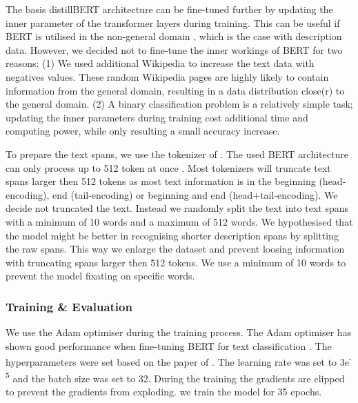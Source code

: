 \documentclass[a4paper, 12pt, oneside]{book} %
\begin{document}
The basis distillBERT architecture can be fine-tuned further by updating the inner parameter of the transformer layers during training. 
This can be useful if BERT is utilised in the non-general domain \autocite{devlin_bert_2019, sun_how_2020, sanh_distilbert_2020}, which is the case with description data.
However, we decided not to fine-tune the inner workings of BERT for two reasons: 
(1) We used additional Wikipedia to increase the text data with negatives values.
These random Wikipedia pages are highly likely to contain information from the general
domain, resulting in a  data distribution close(r) to the general domain.
(2) A binary classification problem is a relatively simple task; updating the inner parameters during training cost additional time and computing power, while only resulting a small accuracy increase.

To prepare the text spans, we use the tokenizer of \textcite{wolf_huggingfaces_2020}.
The used BERT architecture can only process up to 512 token at once \autocite{sanh_distilbert_2020, devlin_bert_2019}.
Most tokenizers will truncate text spans larger then 512 tokens as most text information is in the beginning (head-encoding), end (tail-encoding) or beginning and end (head+tail-encoding).
We decide not truncated the text.
Instead we randomly split the text into text spans with a minimum of 10 words and a maximum of 512 words.
We hypothesised that the model might be better in recognising shorter description spans by splitting the raw spans.  
This way we enlarge the dataset and prevent loosing information with truncating spans larger then 512 tokens. 
We use a minimum of 10 words to prevent the model fixating on specific words.


\subsubsection{Training \& Evaluation}
We use the Adam optimiser \autocite{kingma_adam_2017} during the training process.
The Adam optimiser has shown good performance when fine-tuning BERT for text classification \autocite{you_large_2020}.
The hyperparameters were set based on the paper of \textcite{sun_how_2020}.
The learning rate was set to 3e\textsuperscript{-5} and the batch size was set to 32.
During the training the gradients are clipped to prevent the gradients from exploding.
we train the model for 35 epochs.
\end{document}
